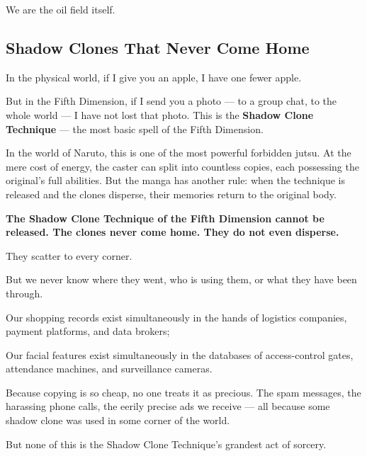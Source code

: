\begin{importantbox}
We are the oil field itself.
\end{importantbox}

\subsection{Shadow Clones That Never Come Home}

In the physical world, if I give you an apple, I have one fewer apple.

But in the Fifth Dimension, if I send you a photo --- to a group chat, to the whole world --- I have not lost that photo.
This is the \textbf{Shadow Clone Technique} --- the most basic spell of the Fifth Dimension.

\vspace{1em}

In the world of Naruto, this is one of the most powerful forbidden jutsu. At the mere cost of energy, the caster can split into countless copies, each possessing the original's full abilities. But the manga has another rule: when the technique is released and the clones disperse, their memories return to the original body.

\textbf{The Shadow Clone Technique of the Fifth Dimension cannot be released. The clones never come home. They do not even disperse.}

\vspace{1em}

They scatter to every corner.

But we never know where they went, who is using them, or what they have been through.

Our shopping records exist simultaneously in the hands of logistics companies, payment platforms, and data brokers;

Our facial features exist simultaneously in the databases of access-control gates, attendance machines, and surveillance cameras.

\vspace{1em}

Because copying is so cheap, no one treats it as precious.
The spam messages, the harassing phone calls, the eerily precise ads we receive --- all because some shadow clone was used in some corner of the world.

\vspace{1em}

But none of this is the Shadow Clone Technique's grandest act of sorcery.

